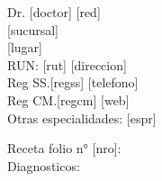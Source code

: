 \documentclass{article}
\begin{document}
\noindent Dr. [doctor]	\hfill \phantom	\hfill [red] \\
\noindent [esp1]		\hfill \phantom	\hfill [sucursal] \\
\noindent [esp2]	\hfill \phantom	\hfill [lugar] \\
\noindent RUN: [rut]	\hfill \phantom	\hfill [direccion] \\
\noindent Reg SS.[regss]	\hfill \phantom	\hfill [telefono] \\
\noindent Reg CM.[regcm]	\hfill \phantom	\hfill [web] \\
\noindent Otras especialidades: [espr]

\noindent Receta folio n° [nro]: \hfill \phantom \hfill \\ 

\noindent Diagnosticos: \\ \\
\end{document}
